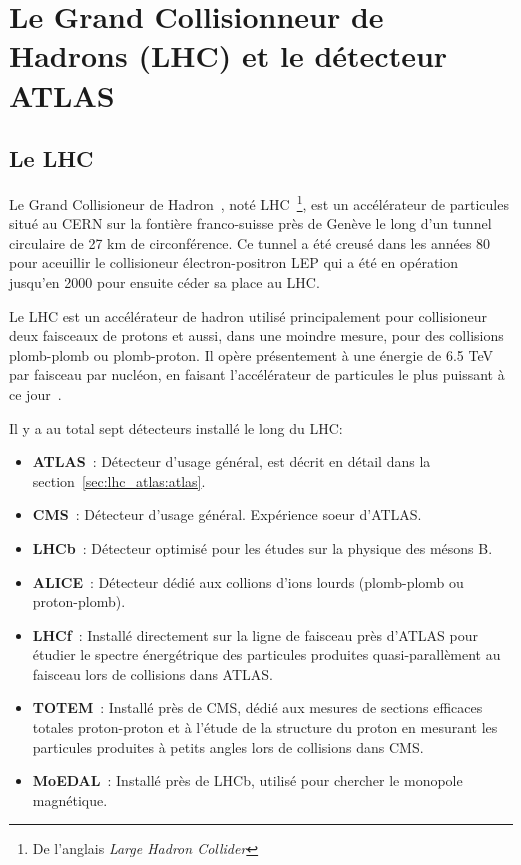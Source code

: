 \singlespacing
\chapter{Le Grand Collisionneur de Hadrons (LHC) et le détecteur
  ATLAS}
\label{sec:lhc_atlas}
\doublespacing{}

\section{Le LHC}
\label{sec:lhc_atlas:lhc}

Le Grand Collisioneur de Hadron~\cite{evans_lhc_2008}, noté
LHC~\footnote{De l'anglais \emph{Large Hadron Collider}}, est un
accélérateur de particules situé au CERN sur la fontière franco-suisse
près de Genève le long d'un tunnel circulaire de 27 km de
circonférence.  Ce tunnel a été creusé dans les années 80 pour
aceuillir le collisioneur électron-positron LEP qui a été en opération
jusqu'en 2000 pour ensuite céder sa place au LHC.

Le LHC est un accélérateur de hadron utilisé principalement pour
collisioneur deux faisceaux de protons et aussi, dans une moindre
mesure, pour des collisions plomb-plomb ou plomb-proton. Il opère
présentement à une énergie de 6.5 TeV par faisceau par nucléon, en
faisant l'accélérateur de particules le plus puissant à ce
jour~\cite{olive_parameters_2014}.

Il y a au total sept détecteurs installé le long du LHC:
\def\labelitemi{$\bullet$}
\begin{itemize}
\item \textbf{ATLAS}~\cite{collaboration_atlas_2008}: Détecteur
  d'usage général, est décrit en détail dans la
  section~\ref{sec:lhc_atlas:atlas}.
\item \textbf{CMS}~\cite{collaboration_cms_2008}: Détecteur d'usage
  général. Expérience soeur d'ATLAS.
\item \textbf{LHCb}~\cite{nakada_lhcb_2000}: Détecteur optimisé pour
  les études sur la physique des mésons B.
\item \textbf{ALICE}~\cite{collaboration_alice_2008}: Détecteur dédié
  aux collions d'ions lourds (plomb-plomb ou proton-plomb).
\item \textbf{LHCf}~\cite{collaboration_lhcf_2008}: Installé
  directement sur la ligne de faisceau près d'ATLAS pour étudier le
  spectre énergétrique des particules produites quasi-parallèment au
  faisceau lors de collisions dans ATLAS.
\item \textbf{TOTEM}~\cite{collaboration_totem_2008}: Installé près de
  CMS, dédié aux mesures de sections efficaces totales proton-proton
  et à l'étude de la structure du proton en mesurant les particules
  produites à petits angles lors de collisions dans CMS.
\item \textbf{MoEDAL}~\cite{Pinfold:1181486}: Installé près de LHCb,
  utilisé pour chercher le monopole magnétique. \\
\end{itemize}

